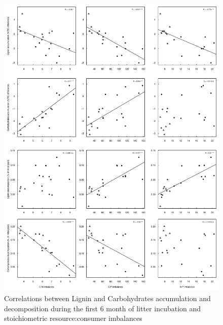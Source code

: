 \documentclass[10pt]{article}
\begin{document}
\newpage
\begin{figure}[h!]
\vspace*{2mm}
\begin{center}
\includegraphics{plosone-graphcorr3}
\end{center}
\caption{Correlations between Lignin and Carbohydrates accumulation and decomposition during the first 6 month of litter incubation and stoichiometric resource:consumer imbalances}
\label{fig:cor3}
\end{figure}
\end{document}
